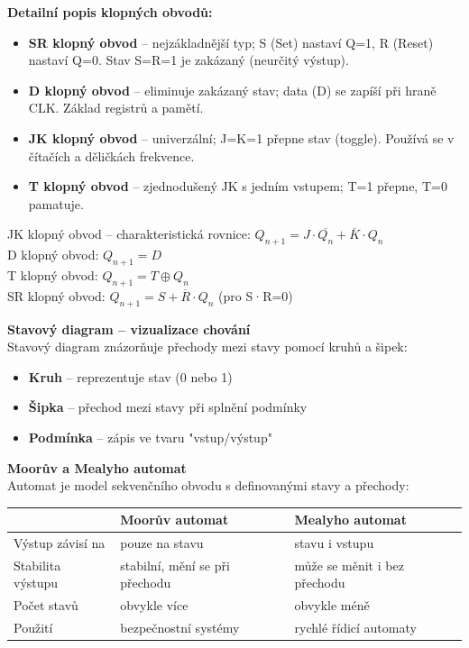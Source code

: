 \documentclass[a4paper,10pt]{article}
\begin{document}
\begin{vysvetlenibox}
\textbf{Detailní popis klopných obvodů:}
\begin{itemize}[noitemsep, leftmargin=1.4em, topsep=4pt]
    \item \textbf{SR klopný obvod} -- nejzákladnější typ; S (Set) nastaví Q=1,
          R (Reset) nastaví Q=0. Stav S=R=1 je zakázaný (neurčitý výstup).
    \item \textbf{D klopný obvod} -- eliminuje zakázaný stav; data (D) se
          zapíší při hraně CLK. Základ registrů a pamětí.
    \item \textbf{JK klopný obvod} -- univerzální; J=K=1 přepne stav (toggle).
          Používá se v čítačích a děličkách frekvence.
    \item \textbf{T klopný obvod} -- zjednodušený JK s jedním vstupem;
          T=1 přepne, T=0 pamatuje.
\end{itemize}

\begin{vzorcebox}
JK klopný obvod -- charakteristická rovnice:
$Q_{n+1} = J \cdot \overline{Q_n} + \overline{K} \cdot Q_n$\\
D klopný obvod: $Q_{n+1} = D$\\
T klopný obvod: $Q_{n+1} = T \oplus Q_n$\\
SR klopný obvod: $Q_{n+1} = S + \overline{R} \cdot Q_n$ (pro S·R=0)
\end{vzorcebox}

\textbf{Stavový diagram -- vizualizace chování}\\
Stavový diagram znázorňuje přechody mezi stavy pomocí kruhů a šipek:
\begin{itemize}[noitemsep, leftmargin=1.4em, topsep=4pt]
    \item \textbf{Kruh} -- reprezentuje stav (0 nebo 1)
    \item \textbf{Šipka} -- přechod mezi stavy při splnění podmínky
    \item \textbf{Podmínka} -- zápis ve tvaru "vstup/výstup"
\end{itemize}

\textbf{Moorův a Mealyho automat}\\
Automat je model sekvenčního obvodu s definovanými stavy a přechody:

\begin{center}
\begin{tabularx}{0.95\linewidth}{@{} l X X @{}}
    \toprule
    & \textbf{Moorův automat} & \textbf{Mealyho automat} \\
    \midrule
    Výstup závisí na & pouze na stavu & stavu i vstupu \\
    Stabilita výstupu & stabilní, mění se při přechodu & může se měnit i bez přechodu \\
    Počet stavů & obvykle více & obvykle méně \\
    Použití & bezpečnostní systémy & rychlé řídicí automaty \\
    \bottomrule
\end{tabularx}
\end{center}


\end{vysvetlenibox}
\end{document}
